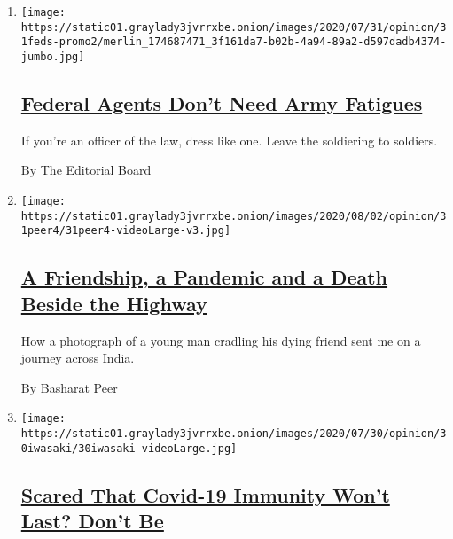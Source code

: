 \begin{enumerate}
\def\labelenumi{\arabic{enumi}.}
\item
  \texttt{[image: https://static01.graylady3jvrrxbe.onion/images/2020/07/31/opinion/31feds-promo2/merlin\_174687471\_3f161da7-b02b-4a94-89a2-d597dadb4374-jumbo.jpg]}

  \hypertarget{federal-agents-dont-need-army-fatigues}{%
  \subsection{\texorpdfstring{\href{/2020/07/31/opinion/federal-agents-trump-uniforms.html}{Federal
  Agents Don't Need Army
  Fatigues}}{Federal Agents Don't Need Army Fatigues}}\label{federal-agents-dont-need-army-fatigues}}

  If you're an officer of the law, dress like one. Leave the soldiering
  to soldiers.

  By The Editorial Board
\item
  \texttt{[image: https://static01.graylady3jvrrxbe.onion/images/2020/08/02/opinion/31peer4/31peer4-videoLarge-v3.jpg]}

  \hypertarget{a-friendship-a-pandemic-and-a-death-beside-the-highway}{%
  \subsection{\texorpdfstring{\href{/2020/07/31/opinion/sunday/India-migration-coronavirus.html}{A
  Friendship, a Pandemic and a Death Beside the
  Highway}}{A Friendship, a Pandemic and a Death Beside the Highway}}\label{a-friendship-a-pandemic-and-a-death-beside-the-highway}}

  How a photograph of a young man cradling his dying friend sent me on a
  journey across India.

  By Basharat Peer
\item
  \texttt{[image: https://static01.graylady3jvrrxbe.onion/images/2020/07/30/opinion/30iwasaki/30iwasaki-videoLarge.jpg]}

  \hypertarget{scared-that-covid-19-immunity-wont-last-dont-be}{%
  \subsection{\texorpdfstring{\href{/2020/07/31/opinion/coronavirus-antibodies-immunity.html}{Scared
  That Covid-19 Immunity Won't Last? Don't
  Be}}{Scared That Covid-19 Immunity Won't Last? Don't Be}}\label{scared-that-covid-19-immunity-wont-last-dont-be}}


\end{enumerate}

